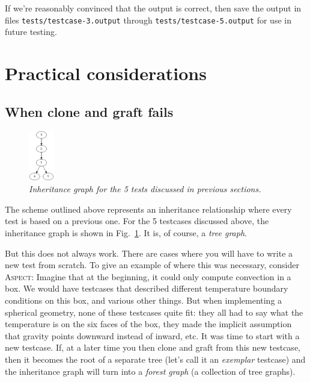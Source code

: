 \documentclass{article}
\newcommand{\aspect}{\textsc{Aspect}}
\begin{document}
If we're reasonably convinced that the output is correct, then save the output
in files \texttt{tests/testcase-3.output} through
\texttt{tests/testcase-5.output} for use in future testing.

\section{Practical considerations}
\label{sec:practice}

\subsection{When clone and graft fails}

\begin{figure}
  \begin{center}
    \vspace*{-24pt}
    \includegraphics[width=0.1\textwidth]{figures/inheritance.png}
    \vspace*{-12pt}
  \end{center}
  \caption{\it Inheritance graph for the 5 tests discussed in previous sections.}
  \vspace*{-3mm}
  \label{fig:inheritance}
\end{figure}
The scheme outlined above represents an inheritance relationship where every
test is based on a previous one. For the 5 testcases discussed above, the
inheritance graph is shown in Fig.~\ref{fig:inheritance}. It is, of course, a
\textit{tree graph}.

But this does not always work. There are cases where you will have to write a
new test from scratch. To give an example of where this was necessary,
consider \aspect{}: Imagine that at the beginning, it could only compute
convection in a box. We would have testcases that described different
temperature boundary conditions on this box, and various other things. But
when implementing a spherical geometry, none of these testcases quite fit:
they all had to say what the temperature is on the six faces of the box, they
made the implicit assumption that gravity points downward instead of inward,
etc. It was time to start with a new testcase. If, at a later time you then
clone and graft from this new testcase, then it becomes the root of a separate
tree (let's call it an \textit{exemplar} testcase) and the inheritance graph
will turn into a \textit{forest graph} (a collection of tree graphs).
\end{document}

